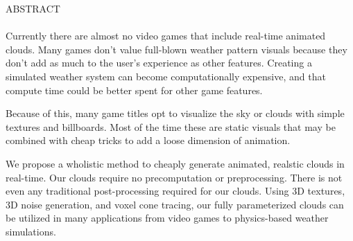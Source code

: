 \newpage
\begin{center}\Large{ABSTRACT}\end{center}
\paragraph{}
Currently there are almost no video games that include real-time animated clouds. Many games don't value full-blown weather pattern visuals because they don't add as much to the user's experience as other features. 
Creating a simulated weather system can become computationally expensive, and that compute time could be better spent for other game features. 

Because of this, many game titles opt to visualize the sky or clouds with simple textures and billboards. 
Most of the time these are static visuals that may be combined with cheap tricks to add a loose dimension of animation.

We propose a wholistic method to cheaply generate animated, realstic clouds in real-time. Our clouds require no precomputation or preprocessing. There is not even any traditional post-processing required for our clouds. Using 3D textures, 3D noise generation, and voxel cone tracing, our fully parameterized clouds can be utilized in many applications from video games to physics-based weather simulations.


